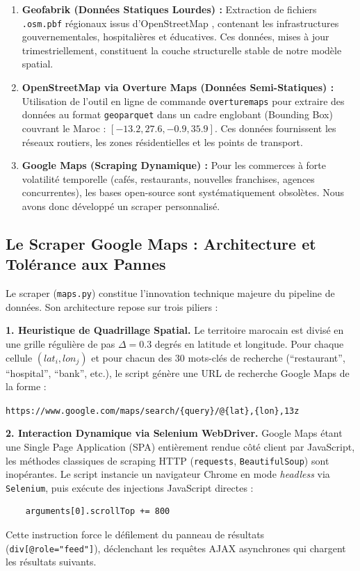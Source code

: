 \documentclass[11pt,a4paper,twoside]{report}
\begin{document}
\begin{enumerate}
    \item \textbf{Geofabrik (Données Statiques Lourdes) :} Extraction de fichiers \texttt{.osm.pbf} régionaux issus d'OpenStreetMap \cite{openstreetmap}, contenant les infrastructures gouvernementales, hospitalières et éducatives. Ces données, mises à jour trimestriellement, constituent la couche structurelle stable de notre modèle spatial.
    \item \textbf{OpenStreetMap via Overture Maps (Données Semi-Statiques) :} Utilisation de l'outil en ligne de commande \texttt{overturemaps} pour extraire des données au format \texttt{geoparquet} dans un cadre englobant (Bounding Box) couvrant le Maroc : $[-13.2, 27.6, -0.9, 35.9]$. Ces données fournissent les réseaux routiers, les zones résidentielles et les points de transport.
    \item \textbf{Google Maps (Scraping Dynamique) :} Pour les commerces à forte volatilité temporelle (cafés, restaurants, nouvelles franchises, agences concurrentes), les bases open-source sont systématiquement obsolètes. Nous avons donc développé un scraper personnalisé.
\end{enumerate}

\subsection{Le Scraper Google Maps : Architecture et Tolérance aux Pannes}

Le scraper (\texttt{maps.py}) constitue l'innovation technique majeure du pipeline de données. Son architecture repose sur trois piliers :

\textbf{1. Heuristique de Quadrillage Spatial.} Le territoire marocain est divisé en une grille régulière de pas $\Delta = 0.3$ degrés en latitude et longitude. Pour chaque cellule $(lat_i, lon_j)$ et pour chacun des 30 mots-clés de recherche (``restaurant'', ``hospital'', ``bank'', etc.), le script génère une URL de recherche Google Maps de la forme :
\begin{center}
\texttt{https://www.google.com/maps/search/\{query\}/@\{lat\},\{lon\},13z}
\end{center}

\textbf{2. Interaction Dynamique via Selenium WebDriver.} Google Maps étant une Single Page Application (SPA) entièrement rendue côté client par JavaScript, les méthodes classiques de scraping HTTP (\texttt{requests}, \texttt{BeautifulSoup}) sont inopérantes. Le script instancie un navigateur Chrome en mode \textit{headless} via \texttt{Selenium}, puis exécute des injections JavaScript directes :
\begin{verbatim}
    arguments[0].scrollTop += 800
\end{verbatim}
Cette instruction force le défilement du panneau de résultats (\texttt{div[@role="feed"]}), déclenchant les requêtes AJAX asynchrones qui chargent les résultats suivants.
\end{document}
